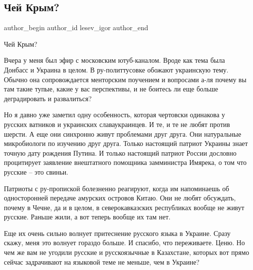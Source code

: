  
 
 
 
 
 
\subsection{Чей Крым?}
\label{sec:17_12_2021.fb.lesev_igor.1.chej_krym}
 
\ifcmt
 author_begin
   author_id lesev_igor
 author_end
\fi

Чей Крым?

Вчера у меня был эфир с московским ютуб-каналом. Вроде как тема была Донбасс и
Украина в целом. В ру-политтусовке обожают украинскую тему. Обычно она
сопровождается менторским поучением и вопросами а-ля почему вы там такие тупые,
какие у вас перспективы, и не боитесь ли еще больше деградировать и
развалиться?


Но я давно уже заметил одну особенность, которая чертовски одинакова у русских
ватников и украинских славаукраинцев. И те, и те не любят против шерсти. А еще
они синхронно живут проблемами друг друга. Они натуральные микробиологи по
изучению друг друга. Только настоящий патриот Украины знает точную дату
рождения Путина. И только настоящий патриот России дословно процитирует
заявление внештатного помощника замминистра Имярека, о том что русские – это
свиньи.

Патриоты с ру-пропиской болезненно реагируют, когда им напоминаешь об
односторонней передаче амурских островов Китаю. Они не любят обсуждать, почему
в Чечне, да и в целом, в северокавказских республиках вообще не живут русские.
Раньше жили, а вот теперь вообще их там нет.

Еще их очень сильно волнует притеснение русского языка в Украине. Сразу скажу,
меня это волнует гораздо больше. И спасибо, что переживаете. Ценю. Но чем же
вам не угодили русские и русскоязычные в Казахстане, которых вот прямо сейчас
задрачивают на языковой теме не меньше, чем в Украине?

